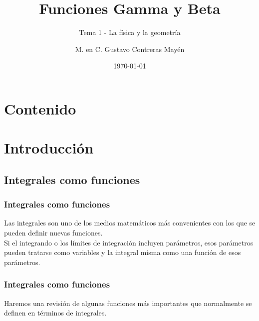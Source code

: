 
\title{\large{Funciones Gamma y Beta}}
\subtitle{Tema 1 - La física y la geometría}
\author{M. en C. Gustavo Contreras Mayén}
\date{\today}

\maketitle
\fontsize{14}{14}\selectfont
{}
\section*{Contenido}
\section{Introducción}
\subsection{Integrales como funciones}
\begin{frame}
\frametitle{Integrales como funciones}
Las integrales son uno de los medios matemáticos más convenientes con los que se pueden definir nuevas funciones.
\\
\bigskip
Si el integrando o los límites de integración incluyen parámetros, esos parámetros pueden tratarse como variables y la integral misma como una función de esos parámetros.
\end{frame}
\begin{frame}
\frametitle{Integrales como funciones}
Haremos una revisión de algunas funciones más importantes que normalmente se definen en términos de integrales.
\end{frame}
